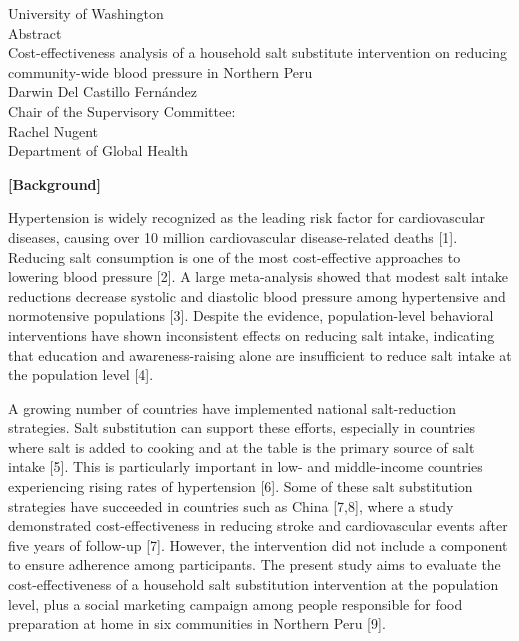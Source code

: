 \documentclass[12pt]{report}
\newcommand{\thesistitle}{Cost-effectiveness analysis of a household salt substitute intervention on reducing community-wide blood pressure in Northern Peru}
\newcommand{\authorname}{Darwin Del Castillo Fernández}
\newcommand{\chairname}{Rachel Nugent}
\newcommand{\chairdepartment}{Department of Global Health}
\begin{document}

\thispagestyle{plain}
\begin{center}
University of Washington\\
\vspace{0.5cm}
{\large Abstract}\\
\vspace{0.5cm}
{\large \thesistitle}\\
\vspace{0.5cm}
{\large \authorname}\\
\vspace{0.5cm}
Chair of the Supervisory Committee:\\
\chairname\\
\chairdepartment\\
\end{center}

\vspace{1cm}

\noindent\textbf{[Background]}

Hypertension is widely recognized as the leading risk factor for cardiovascular diseases, causing over 10 million cardiovascular disease-related deaths [1]. Reducing salt consumption is one of the most cost-effective approaches to lowering blood pressure [2]. A large meta-analysis showed that modest salt intake reductions decrease systolic and diastolic blood pressure among hypertensive and normotensive populations [3]. Despite the evidence, population-level behavioral interventions have shown inconsistent effects on reducing salt intake, indicating that education and awareness-raising alone are insufficient to reduce salt intake at the population level [4].

A growing number of countries have implemented national salt-reduction strategies. Salt substitution can support these efforts, especially in countries where salt is added to cooking and at the table is the primary source of salt intake [5]. This is particularly important in low- and middle-income countries experiencing rising rates of hypertension [6]. Some of these salt substitution strategies have succeeded in countries such as China [7,8], where a study demonstrated cost-effectiveness in reducing stroke and cardiovascular events after five years of follow-up [7]. However, the intervention did not include a component to ensure adherence among participants. The present study aims to evaluate the cost-effectiveness of a household salt substitution intervention at the population level, plus a social marketing campaign among people responsible for food preparation at home in six communities in Northern Peru [9].
\end{document}

